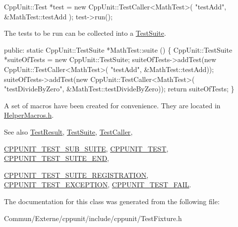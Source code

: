 \begin{DoxyCode}
CppUnit::Test *test = \textcolor{keyword}{new} CppUnit::TestCaller<MathTest>( \textcolor{stringliteral}{"testAdd"}, 
                                                         &MathTest::testAdd );
test->run();
\end{DoxyCode}


The tests to be run can be collected into a \hyperlink{class_test_suite}{Test\+Suite}.


\begin{DoxyCode}
\textcolor{keyword}{public}: 
  \textcolor{keyword}{static} CppUnit::TestSuite *MathTest::suite () \{
     CppUnit::TestSuite *suiteOfTests = \textcolor{keyword}{new} CppUnit::TestSuite;
     suiteOfTests->addTest(\textcolor{keyword}{new} CppUnit::TestCaller<MathTest>(
                             \textcolor{stringliteral}{"testAdd"}, &MathTest::testAdd));
     suiteOfTests->addTest(\textcolor{keyword}{new} CppUnit::TestCaller<MathTest>(
                             \textcolor{stringliteral}{"testDivideByZero"}, &MathTest::testDivideByZero));
     \textcolor{keywordflow}{return} suiteOfTests;
 \}
\end{DoxyCode}


A set of macros have been created for convenience. They are located in \hyperlink{_helper_macros_8h}{Helper\+Macros.\+h}.

\begin{DoxySeeAlso}{See also}
\hyperlink{class_test_result}{Test\+Result}, \hyperlink{class_test_suite}{Test\+Suite}, \hyperlink{class_test_caller}{Test\+Caller}, 

\hyperlink{group___writing_test_fixture_gae19f30ade82172cf6c3ff297367a10c2}{C\+P\+P\+U\+N\+I\+T\+\_\+\+T\+E\+S\+T\+\_\+\+S\+U\+B\+\_\+\+S\+U\+I\+TE}, \hyperlink{group___writing_test_fixture_ga6ba5fe7b8f52e401268b984008838754}{C\+P\+P\+U\+N\+I\+T\+\_\+\+T\+E\+ST}, \hyperlink{group___writing_test_fixture_ga3b353d6e84f681ae85cced96dce0a4ae}{C\+P\+P\+U\+N\+I\+T\+\_\+\+T\+E\+S\+T\+\_\+\+S\+U\+I\+T\+E\+\_\+\+E\+ND}, 

\hyperlink{_helper_macros_8h_a70f00cc9f589d24019ee9efee4de2d74}{C\+P\+P\+U\+N\+I\+T\+\_\+\+T\+E\+S\+T\+\_\+\+S\+U\+I\+T\+E\+\_\+\+R\+E\+G\+I\+S\+T\+R\+A\+T\+I\+ON}, \hyperlink{group___writing_test_fixture_ga0d51339f412270aee9a2d6c015d80ef2}{C\+P\+P\+U\+N\+I\+T\+\_\+\+T\+E\+S\+T\+\_\+\+E\+X\+C\+E\+P\+T\+I\+ON}, \hyperlink{group___writing_test_fixture_ga5bdaf0444216a8f93ead13d5ae964d7e}{C\+P\+P\+U\+N\+I\+T\+\_\+\+T\+E\+S\+T\+\_\+\+F\+A\+IL}. 
\end{DoxySeeAlso}


The documentation for this class was generated from the following file\+:\begin{DoxyCompactItemize}
\item 
Commun/\+Externe/cppunit/include/cppunit/Test\+Fixture.\+h\end{DoxyCompactItemize}
